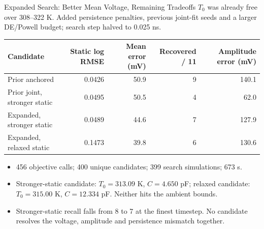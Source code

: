 \begin{frame}{Expanded Search: Better Mean Voltage, Remaining Tradeoffs}
\small
\(T_0\) was already free over 308--322 K. Added persistence penalties,
previous joint-fit seeds and a larger DE/Powell budget; search step halved to 0.025 ns.
\vspace{0.2cm}
\scriptsize
\begin{tabular}{lrrrr}
\toprule
Candidate & Static log RMSE & Mean error (mV) & Recovered / 11 & Amplitude error (mV)\\
\midrule
Prior anchored & 0.0426 & 50.9 & 9 & 140.1\\
Prior joint, stronger static & 0.0495 & 50.5 & 4 & 62.0\\
Expanded, stronger static & 0.0489 & 44.6 & 7 & 127.9\\
Expanded, relaxed static & 0.1473 & 39.8 & 6 & 130.6\\
\bottomrule
\end{tabular}
\vspace{0.2cm}
\begin{itemize}
\item 456 objective calls; 400 unique candidates; 399 search simulations; 673 s.
\item Stronger-static candidate: \(T_0=313.09\) K, \(C=4.650\) pF;
relaxed candidate: \(T_0=315.00\) K, \(C=12.334\) pF. Neither hits the ambient bounds.
\item Stronger-static recall falls from 8 to 7 at the finest timestep.
No candidate resolves the voltage, amplitude and persistence mismatch together.
\end{itemize}
\end{frame}

